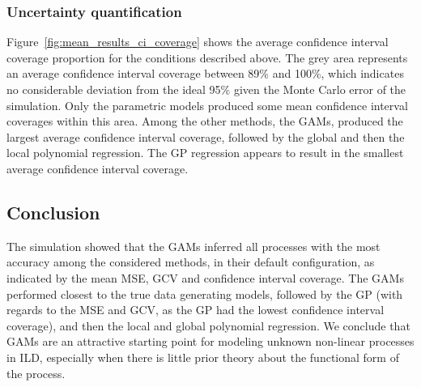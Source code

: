 \documentclass[man, floatsintext]{apa7}
\begin{document}
\subsubsection{Uncertainty quantification}

Figure~\ref{fig:mean_results_ci_coverage} shows the average confidence interval
coverage proportion for the conditions described above. The grey area
represents an average confidence interval coverage between 89\% and 100\%,
which indicates no considerable deviation from the ideal 95\% given the Monte
Carlo error of the simulation. Only the parametric models produced some mean
confidence interval coverages within this area. Among the other methods, the
GAMs, produced the largest average confidence interval coverage, followed by
the global and then the local polynomial regression. The GP regression appears
to result in the smallest average confidence interval coverage.

\begin{sidewaysfigure*}[htbp]
  \caption{Average confidence interval coverage across all processes, analysis
    methods, and simulation conditions}
  \label{fig:mean_results_ci_coverage}
\end{sidewaysfigure*}

\subsection{Conclusion}

The simulation showed that the GAMs inferred all processes with the most
accuracy among the considered methods, in their default configuration, as
indicated by the mean MSE, GCV and confidence interval coverage. The GAMs
performed closest to the true data generating models, followed by the GP (with
regards to the MSE and GCV, as the GP had the lowest confidence interval
coverage), and then the local and global polynomial regression. We conclude
that GAMs are an attractive starting point for modeling unknown non-linear
processes in ILD, especially when there is little prior theory about the
functional form of the process.
\end{document}

